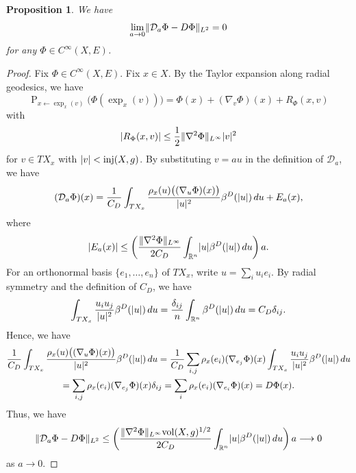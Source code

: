 \documentclass[a4paper,oneside,12pt]{amsart}
\theoremstyle{plain}
\newtheorem{proposition}[theorem]{Proposition}
\theoremstyle{definition}
\theoremstyle{remark}
\newcommand{\R}{\mathbb{R}}
\DeclarePairedDelimiter{\abs}{\lvert}{\rvert}
\DeclarePairedDelimiter{\norm}{\lVert}{\rVert}
\DeclareMathOperator{\injectivityradius}{inj}
\newcommand{\volume}{\mathrm{vol}}
\newcommand{\paralleltransport}[2]{\operatorname{P}_{#2 \gets #1}}
\newcommand{\cliffordmultiplication}{\rho}
\newcommand{\Ltwonorm}[2][L^2]{\norm{#2}_{#1}}
\newcommand{\mesoscopicDiracoperator}[1][a]{\mathcal{D}_{#1}}
\newcommand{\cutoff}{\beta}
\newcommand{\cutoffDirac}{\cutoff^D}
\begin{document}
\begin{proposition}\label{proposition: convergence of mesoscopic Dirac operators}
  We have
  \begin{equation}
    \lim_{a \to 0} \Ltwonorm{\mesoscopicDiracoperator \Phi - D\Phi} = 0
  \end{equation}
  for any $\Phi \in C^{\infty}(X,E)$.
\end{proposition}
\begin{proof}
  Fix $\Phi \in C^{\infty}(X,E)$.
  Fix $x \in X$.
  By the Taylor expansion along radial geodesics, we have
  \begin{equation}
    \paralleltransport{\exp_x(v)}{x} \bigl(\Phi(\exp_x(v))\bigr) = \Phi(x) + (\nabla_v \Phi)(x) + R_{\Phi}(x,v)
  \end{equation}
  with
  \begin{equation}
    \abs{R_{\Phi}(x,v)} \le \frac{1}{2}\norm{\nabla^2 \Phi}_{L^{\infty}} \abs{v}^2
  \end{equation}
  for $v \in TX_x$ with $\abs{v} < \injectivityradius(X,g)$.
  By substituting $v = au$ in the definition of $\mesoscopicDiracoperator$, we have
  \begin{equation}
    (\mesoscopicDiracoperator\Phi)(x) = \frac{1}{C_D} \int_{TX_x} \frac{\cliffordmultiplication_x(u) \bigl((\nabla_u\Phi)(x)\bigr)}{\abs{u}^2} \cutoffDirac(\abs{u}) \,du + E_a(x),
  \end{equation}
  where
  \begin{equation}
    \abs{E_a(x)} \le \left( \frac{\norm{\nabla^2 \Phi}_{L^{\infty}}}{2C_D} \int_{\R^n} \abs{u}\cutoffDirac(\abs{u}) \,du \right) a.
  \end{equation}
  For an orthonormal basis $\{e_1,\dots,e_n\}$ of $TX_x$, write $u=\sum_i u_i e_i$.
  By radial symmetry and the definition of $C_D$, we have
  \begin{equation}
    \int_{TX_x} \frac{u_i u_j}{\abs{u}^2} \cutoffDirac(\abs{u}) \,du = \frac{\delta_{ij}}{n} \int_{\R^n} \cutoffDirac(\abs{u}) \,du = C_D \delta_{ij}.
  \end{equation}
  Hence, we have
  \begin{multline}
    \frac{1}{C_D} \int_{TX_x} \frac{\cliffordmultiplication_x(u) \bigl((\nabla_u\Phi)(x)\bigr)}{\abs{u}^2} \cutoffDirac(\abs{u}) \,du = \frac{1}{C_D} \sum_{i,j} \cliffordmultiplication_x(e_i)(\nabla_{e_j}\Phi)(x) \int_{TX_x} \frac{u_i u_j}{\abs{u}^2} \cutoffDirac(\abs{u}) \,du \\
    = \sum_{i,j}\cliffordmultiplication_x(e_i)(\nabla_{e_j}\Phi)(x)\delta_{ij} = \sum_i \cliffordmultiplication_x(e_i)(\nabla_{e_i}\Phi)(x) = D\Phi(x).
  \end{multline}
  Thus, we have
  \begin{equation}
    \Ltwonorm{\mesoscopicDiracoperator\Phi - D\Phi} \le \left(\frac{\norm{\nabla^2 \Phi}_{L^{\infty}} \volume(X,g)^{1/2}}{2C_D} \int_{\R^n} \abs{u}\cutoffDirac(\abs{u}) \,du\right) a \longrightarrow 0
  \end{equation}
  as $a \to 0$.
\end{proof}
\end{document}
